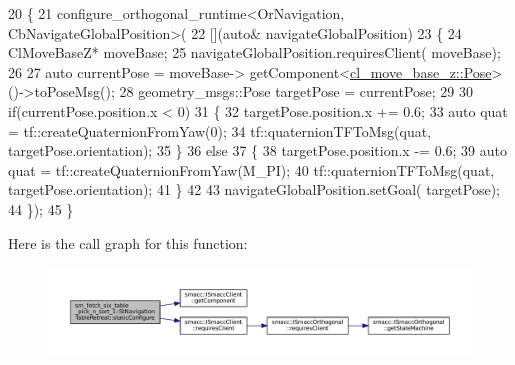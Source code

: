 \begin{DoxyCode}
20         \{
21             configure\_orthogonal\_runtime<OrNavigation, CbNavigateGlobalPosition>(
22                                                                 [](\textcolor{keyword}{auto}& navigateGlobalPosition)
23                                                                 \{
24                                                                     ClMoveBaseZ* moveBase;
25                                                                     navigateGlobalPosition.requiresClient(
      moveBase);
26 
27                                                                     \textcolor{keyword}{auto} currentPose = moveBase->
      getComponent<\hyperlink{classcl__move__base__z_1_1Pose}{cl\_move\_base\_z::Pose}>()->toPoseMsg();
28                                                                     geometry\_msgs::Pose targetPose = 
      currentPose;
29 
30                                                                     \textcolor{keywordflow}{if}(currentPose.position.x < 0)
31                                                                     \{
32                                                                         targetPose.position.x += 0.6;
33                                                                         \textcolor{keyword}{auto} quat = 
      tf::createQuaternionFromYaw(0);
34                                                                         tf::quaternionTFToMsg(quat, 
      targetPose.orientation);
35                                                                     \}
36                                                                     \textcolor{keywordflow}{else}
37                                                                     \{
38                                                                         targetPose.position.x -= 0.6;
39                                                                         \textcolor{keyword}{auto} quat = 
      tf::createQuaternionFromYaw(M\_PI);
40                                                                         tf::quaternionTFToMsg(quat, 
      targetPose.orientation);
41                                                                     \}
42 
43                                                                     navigateGlobalPosition.setGoal(
      targetPose);
44                                                                 \});
45         \}
\end{DoxyCode}
Here is the call graph for this function\+:
\nopagebreak
\begin{figure}[H]
\begin{center}
\leavevmode
\includegraphics[width=350pt]{structsm__fetch__six__table__pick__n__sort__1_1_1StNavigationTableRetreat_a744f9201796aad510626a6ceaed8597c_cgraph}
\end{center}
\end{figure}


